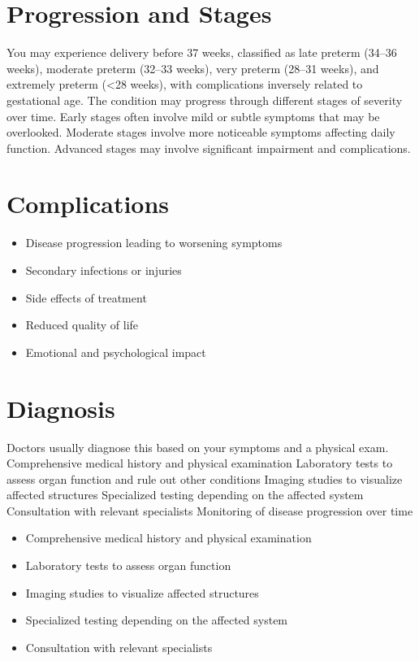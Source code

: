 \section{Progression and Stages}
You may experience delivery before 37 weeks, classified as late preterm (34--36 weeks), moderate preterm (32--33 weeks), very preterm (28--31 weeks), and extremely preterm (<28 weeks), with complications inversely related to gestational age. The condition may progress through different stages of severity over time. Early stages often involve mild or subtle symptoms that may be overlooked. Moderate stages involve more noticeable symptoms affecting daily function. Advanced stages may involve significant impairment and complications.
\section{Complications}
\begin{itemize}[noitemsep]
  \item Disease progression leading to worsening symptoms
  \item Secondary infections or injuries
  \item Side effects of treatment
  \item Reduced quality of life
  \item Emotional and psychological impact
\end{itemize}
\section{Diagnosis}
Doctors usually diagnose this based on your symptoms and a physical exam. Comprehensive medical history and physical examination Laboratory tests to assess organ function and rule out other conditions Imaging studies to visualize affected structures Specialized testing depending on the affected system Consultation with relevant specialists Monitoring of disease progression over time

\begin{itemize}[noitemsep]
  \item Comprehensive medical history and physical examination
  \item Laboratory tests to assess organ function
  \item Imaging studies to visualize affected structures
  \item Specialized testing depending on the affected system
  \item Consultation with relevant specialists
\end{itemize}
